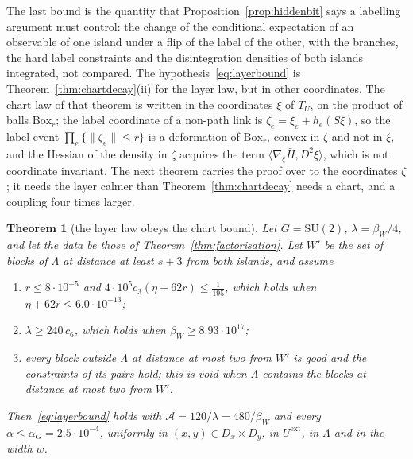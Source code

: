\documentclass[11pt]{amsart}
\newtheorem{theorem}{Theorem}[section]
\theoremstyle{definition}
\theoremstyle{remark}
\numberwithin{equation}{section}
\newcommand{\SU}{\mathrm{SU}}
\begin{document}
The last bound is the quantity that Proposition~\ref{prop:hiddenbit} says
a labelling argument must control: the change of the conditional
expectation of an observable of one island under a flip of the label of
the other, with the branches, the hard label constraints and the
disintegration densities of both islands integrated, not compared. The
hypothesis~\eqref{eq:layerbound} is Theorem~\ref{thm:chartdecay}(ii) for
the layer law, but in other coordinates. The chart law of that theorem is
written in the coordinates $\xi$ of $T_U$, on the product of balls
$\mathrm{Box}_r$; the label coordinate of a non-path link is
$\zeta_e=\xi_e+h_e(S\xi)$, so the label event
$\prod_e\{\lVert\zeta_e\rVert\le r\}$ is a deformation of
$\mathrm{Box}_r$, convex in $\zeta$ and not in $\xi$, and the Hessian of
the density in $\zeta$ acquires the term $\langle\nabla_\xi\bar H,
D^2\xi\rangle$, which is not coordinate invariant. The next theorem
carries the proof over to the coordinates $\zeta$; it needs the layer
calmer than Theorem~\ref{thm:chartdecay} needs a chart, and a coupling
four times larger.

\begin{theorem}[the layer law obeys the chart bound]\label{thm:layerbound}
Let $G=\SU(2)$, $\lambda=\beta_W/4$, and let the data be those of
Theorem~\ref{thm:factorisation}. Let $W'$ be the set of blocks of
$\Lambda$ at distance at least $s+3$ from both islands, and assume
\begin{enumerate}[label=\textup{(\alph*)},leftmargin=*]
\item $r\le8\cdot10^{-5}$ and $4\cdot10^5c_3(\eta+62r)\le\frac1{195}$,
which holds when $\eta+62r\le6.0\cdot10^{-13}$;
\item $\lambda\ge240\,c_6$, which holds when $\beta_W\ge8.93\cdot10^{17}$;
\item every block outside $\Lambda$ at distance at most two from $W'$ is
good and the constraints of its pairs hold; this is void when $\Lambda$
contains the blocks at distance at most two from $W'$.
\end{enumerate}
Then~\eqref{eq:layerbound} holds with $\mathcal A=120/\lambda=480/
\beta_W$ and every $\alpha\le\alpha_G=2.5\cdot10^{-4}$, uniformly in
$(x,y)\in D_x\times D_y$, in $U^{\mathrm{ext}}$, in $\Lambda$ and in the
width $w$.
\end{theorem}
\end{document}
